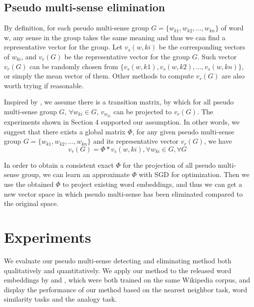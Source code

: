 \documentclass[11pt]{article}
\begin{document}
\subsection{Pseudo multi-sense elimination}
\par
By definition, for each pseudo multi-sense group $G = \{w_{k1}, w_{k2}, ... , w_{kn}\}$ of word w, any sense in the group takes the same meaning and thus we can find a representative vector for the group. Let $v_s(w,ki)$ be the corresponding vectors of $w_{ki}$, and $v_r(G)$ be the representative vector for the group $G$. Such vector $v_r(G)$ can be randomly chosen from $\{v_s(w,k1), v_s(w,k2), ..., v_s(w,kn)\}$, or simply the mean vector of them. Other methods to compute $v_r(G)$ are also worth trying if reasonable. 
\par
Inspired by , we assume there is a transition matrix, by which for all pseudo multi-sense group $G$, $\forall w_{ki} \in G$, $v_{w_{ki}}$ can be projected to $v_r(G)$. The experiments shown in Section 4 supported our assumption. In other words, we suggest that there exists a global matrix $\Phi$, for any given pseudo multi-sense group $G = \{w_{k1}, w_{k2}, ... , w_{kn}\}$ and its representative vector $v_r(G)$, we have
\begin{equation}
v_r(G) = \Phi * v_s(w, ki), \forall w_{ki} \in G, \forall G
\end{equation}
\par
In order to obtain a consistent exact $\Phi$ for the projection of all pseudo multi-sense group, we can learn an approximate $\Phi$ with SGD for optimization. Then we  use the obtained $\Phi$ to project existing word embeddings, and thus we can get a new vector space in which pseudo multi-sense has been eliminated compared to the original space.


\section{Experiments}
\par 
We evaluate our pseudo multi-sense detecting and eliminating method both qualitatively and quantitatively. We apply our method to the released word embeddings by  and , which were both trained on the same Wikipedia corpus, and display the performance of our method based on the nearest neighbor task, word similarity tasks and the analogy task. 
\end{document}
